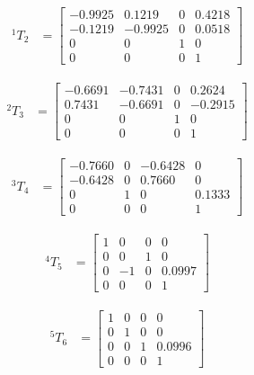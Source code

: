 \documentclass[fleqn]{article}
\begin{document}
\begin{equation}
\begin{split}
^{1}T_{2}&=\begin{bmatrix}
-0.9925 & 0.1219 & 0 & 0.4218\\
-0.1219 & -0.9925 & 0 & 0.0518\\
0 & 0 & 1 & 0\\
0 & 0 & 0 & 1
\end{bmatrix}
\end{split}
\end{equation}

\begin{equation}
\begin{split}
^{2}T_{3}&=\begin{bmatrix}
-0.6691 & -0.7431 & 0 & 0.2624\\
0.7431 & -0.6691 & 0 & -0.2915\\
0 & 0 & 1 & 0\\
0 & 0 & 0 & 1
\end{bmatrix}
\end{split}
\end{equation}

\begin{equation}
\begin{split}
^{3}T_{4}&=\begin{bmatrix}
-0.7660 & 0 & -0.6428 & 0\\
-0.6428 & 0 & 0.7660 & 0\\
0 & 1 & 0 & 0.1333\\
0 & 0 & 0 & 1
\end{bmatrix}
\end{split}
\end{equation}

\begin{equation}
\begin{split}
^{4}T_{5}&=\begin{bmatrix}
1 & 0 & 0 & 0\\
0 & 0 & 1 & 0\\
0 & -1 & 0 & 0.0997\\
0 & 0 & 0 & 1
\end{bmatrix}
\end{split}
\end{equation}

\begin{equation}
\begin{split}
^{5}T_{6}&=\begin{bmatrix}
1 & 0 & 0 & 0\\
0 & 1 & 0 & 0\\
0 & 0 & 1 & 0.0996\\
0 & 0 & 0 & 1
\end{bmatrix}
\end{split}
\end{equation}
\end{document}

